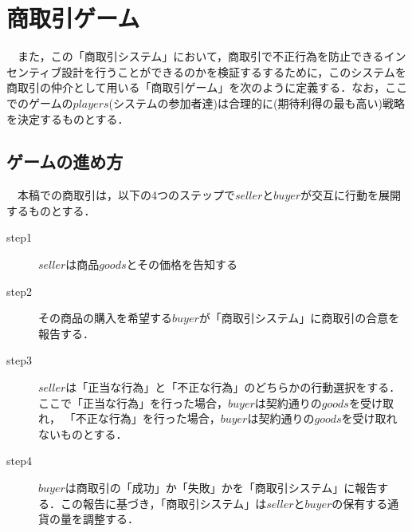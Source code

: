 \section{商取引ゲーム}
　また，この「商取引システム」において，商取引で不正行為を防止できるインセンティブ設計を行うことができるのかを検証するするために，このシステムを商取引の仲介として用いる「商取引ゲーム」を次のように定義する．なお，ここでのゲームの$players$(システムの参加者達)は合理的に(期待利得の最も高い)戦略を決定するものとする．
  
  \subsection{ゲームの進め方}
  　本稿での商取引は，以下の4つのステップで$seller$と$buyer$が交互に行動を展開するものとする．
  
    \begin{description}
      \item[step1] $seller$は商品$goods$とその価格を告知する
      \item[step2]  その商品の購入を希望する$buyer$が「商取引システム」に商取引の合意を報告する．
      \item[step3]  $seller$は「正当な行為」と「不正な行為」のどちらかの行動選択をする．ここで「正当な行為」を行った場合，$buyer$は契約通りの$goods$を受け取れ， 「不正な行為」を行った場合，$buyer$は契約通りの$goods$を受け取れないものとする．
      \item[step4]  $buyer$は商取引の「成功」か「失敗」かを「商取引システム」に報告する．この報告に基づき，「商取引システム」は$ seller$と$ buyer$の保有する通貨の量を調整する．
    \end{description}

